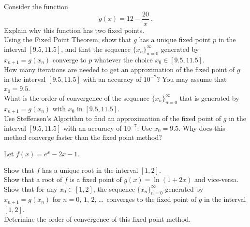 \begin{question}
Consider the function
\[
g(x) = 12 - \frac{20}{x} \ .
\]
 Explain why this function has two fixed points.\\
 Using the Fixed Point Theorem, show that $g$ 
has a unique fixed point $p$ in the interval $[9.5,11.5]$, and that
the sequence $\displaystyle \{x_n\}_{n=0}^\infty$ generated by
$x_{n+1} = g(x_n)$ converge to $p$ whatever the choice
$x_0\in [9.5,11.5]$.\\
 How many iterations are needed to get an approximation of the
fixed point of $g$ in the interval $[9.5,11.5]$ with an accuracy of
$10^{-7}$?  You may assume that $x_0 = 9.5$.\\
 What is the order of convergence of the sequence
$\{x_n\}_{n=0}^\infty$ that is generated by $x_{n+1}= g(x_n)$ with $x_0$ 
in $[9.5,11.5]$.\\
 Use Steffensen's Algorithm to find an
approximation of the fixed point of $g$ in the interval $[9.5,11.5]$
with an accuracy of $10^{-7}$.  Use $x_0 = 9.5$.  Why does this
method converge faster than the fixed point method?
\label{solvAQ18}
\end{question}

\begin{question}
Let $f(x) = e^x -2x-1$.

 Show that $f$ has a unique root in the interval $[1,2]$.\\
 Show that a root of $f$ is a fixed point of
$g(x) = \ln(1+2x)$ and vice-versa.\\
 Show that for any $x_0\in [1,2]$, the sequence
$\displaystyle \{x_n\}_{n=0}^\infty$ generated by $x_{n+1} = g(x_n)$
for $n=0$, $1$, $2$, \ldots\ converges to the fixed point of $g$ in
the interval $[1,2]$.\\
 Determine the order of convergence of this fixed point method.
\label{solvAQ19}
\end{question}

